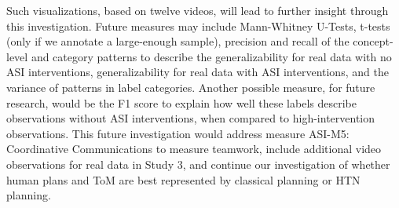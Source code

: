 Such visualizations, based on twelve videos, will lead to further insight
through this investigation. Future measures may include Mann-Whitney U-Tests,
t-tests (only if we annotate a large-enough sample), precision and recall of
the concept-level and category patterns to describe the generalizability for
real data with no ASI interventions, generalizability for real data with ASI
interventions, and the variance of patterns in label categories. Another
possible measure, for future research, would be the F1 score to explain how
well these labels describe observations without ASI interventions, when
compared to high-intervention observations. This future investigation would
address measure ASI-M5: Coordinative Communications to
measure teamwork, include additional video observations for real data in Study
3, and continue our investigation of whether human plans and ToM are best
represented by classical planning or HTN planning.


